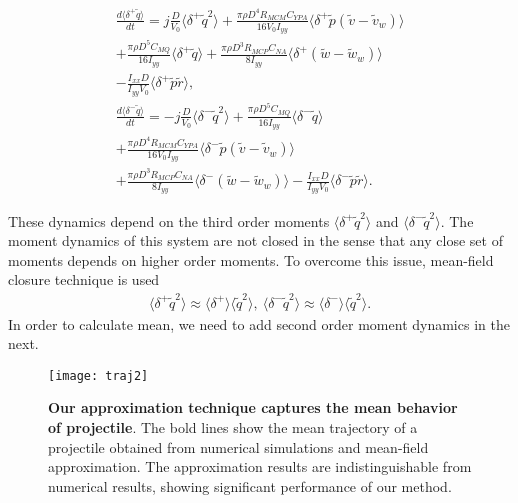 \documentclass[letterpaper, 10 pt, conference]{ieeeconf}  %
\begin{document}
\begin{small}
\begin{gather}
	\frac{d \langle \delta^+ \tilde{q} \rangle}{dt}=  j \frac{D}{V_0} \langle \delta^+ \tilde{q}^2 	\rangle  + \frac{\pi \rho D^4 R_{MCM} 				C_{YPA}}{16 V_0 I_{yy}} \langle \delta^+ \tilde{p} (\tilde{v} -\tilde{v}_w) \rangle \nonumber \\  + \frac{\pi \rho D^5 C_{MQ}}{16 I_{yy}} \langle \delta^+ \tilde{q} \rangle + \frac{\pi \rho D^3 R_{MCP} C_{NA}} {8 I_{yy}} \langle \delta^+ (\tilde{w} - \tilde{w}_w) \rangle \nonumber \\  - \frac{I_{xx} D }{I_{yy} V_0} \langle \delta^+ \tilde{p} \tilde{r}  \rangle, \label{eqn:eij} \\
		\frac{d \langle \delta^- \tilde{q} \rangle}{dt}=  -j \frac{D}{V_0} \langle \delta^- \tilde{q}^2 \rangle  + \frac{\pi \rho D^5 C_{MQ}}{16 I_{yy}} \langle \delta^- \tilde{q} \rangle \nonumber \\ \nonumber +  \frac{\pi \rho D^4 R_{MCM} C_{YPA}}{16 V_0 I_{yy}} \langle \delta^-  \tilde{p} (\tilde{v}-\tilde{v}_w) \rangle \nonumber \\ + \frac{\pi\rho D^3 R_{MCP} C_{NA}}{8 I_{yy}} \langle \delta^- (\tilde{w} - \tilde{w}_w) \rangle - \frac{I_{xx} D}{I_{yy} V_0} \langle \delta^- \tilde{p} \tilde{r} \rangle. \label{eqn:-eij}
\end{gather}
\end{small}
These dynamics depend on the third order moments $\langle \delta^+ \tilde{q}^2 \rangle$ and $\langle \delta^- \tilde{q}^2 \rangle$. The moment dynamics of this system are not closed in the sense that any close set of moments depends on higher order moments. To overcome this issue, mean-field closure technique is used 
\begin{gather}
\langle \delta^+ \tilde{q}^2 \rangle \approx \langle \delta^+ \rangle \langle \tilde{q}^2 \rangle, ~ \langle \delta^- \tilde{q}^2 \rangle \approx \langle \delta^- \rangle \langle \tilde{q}^2 \rangle.
\end{gather}
In order to calculate mean, we need to add second order moment dynamics in the next. 



\begin{figure}[!b]
\centering
\texttt{[image: traj2]}
\caption{\textbf{Our approximation technique captures the mean behavior of projectile}. The bold lines show the mean trajectory of a projectile obtained from numerical simulations and mean-field approximation. The approximation results are indistinguishable from numerical results, showing significant performance of our method.}
\label{fig:9tra}
\end{figure}
\end{document}
